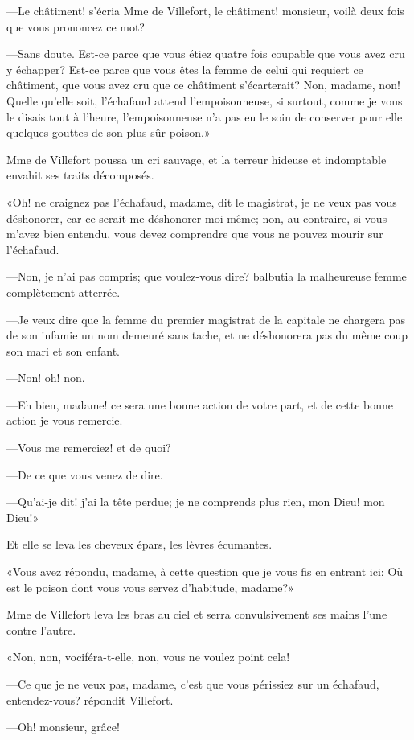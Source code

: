 —Le châtiment! s'écria Mme de Villefort, le châtiment! monsieur, voilà deux fois que vous prononcez ce mot? 

—Sans doute. Est-ce parce que vous étiez quatre fois coupable que vous avez cru y échapper? Est-ce parce que vous êtes la femme de celui qui requiert ce châtiment, que vous avez cru que ce châtiment s'écarterait? Non, madame, non! Quelle qu'elle soit, l'échafaud attend l'empoisonneuse, si surtout, comme je vous le disais tout à l'heure, l'empoisonneuse n'a pas eu le soin de conserver pour elle quelques gouttes de son plus sûr poison.» 

Mme de Villefort poussa un cri sauvage, et la terreur hideuse et indomptable envahit ses traits décomposés. 

«Oh! ne craignez pas l'échafaud, madame, dit le magistrat, je ne veux pas vous déshonorer, car ce serait me déshonorer moi-même; non, au contraire, si vous m'avez bien entendu, vous devez comprendre que vous ne pouvez mourir sur l'échafaud. 

—Non, je n'ai pas compris; que voulez-vous dire? balbutia la malheureuse femme complètement atterrée. 

—Je veux dire que la femme du premier magistrat de la capitale ne chargera pas de son infamie un nom demeuré sans tache, et ne déshonorera pas du même coup son mari et son enfant. 

—Non! oh! non. 

—Eh bien, madame! ce sera une bonne action de votre part, et de cette bonne action je vous remercie. 

—Vous me remerciez! et de quoi? 

—De ce que vous venez de dire. 

—Qu'ai-je dit! j'ai la tête perdue; je ne comprends plus rien, mon Dieu! mon Dieu!» 

Et elle se leva les cheveux épars, les lèvres écumantes. 

«Vous avez répondu, madame, à cette question que je vous fis en entrant ici: Où est le poison dont vous vous servez d'habitude, madame?» 

Mme de Villefort leva les bras au ciel et serra convulsivement ses mains l'une contre l'autre. 

«Non, non, vociféra-t-elle, non, vous ne voulez point cela! 

—Ce que je ne veux pas, madame, c'est que vous périssiez sur un échafaud, entendez-vous? répondit Villefort. 

—Oh! monsieur, grâce! 

